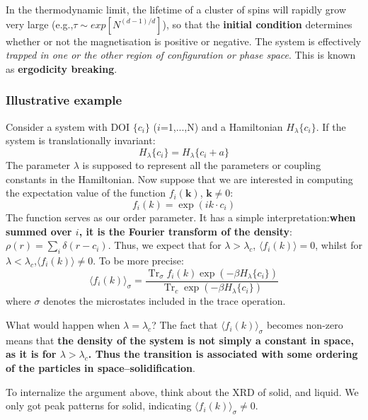 \documentclass[12pt,titlepage]{article}
\numberwithin{equation}{section}
\begin{document}
In the thermodynamic limit, the lifetime of a cluster of spins will rapidly grow very large (e.g.,$\tau\sim exp[N^{(d-1)/d}]$), so that the \textbf{initial condition} determines whether or not the magnetisation is positive or negative. The system is effectively \textit{trapped in one or the other region of configuration or phase space}. This is known as \textbf{ergodicity breaking}.

\subsubsection{Illustrative example}
Consider a system with DOI $\{c_i\}$ ($i$=1,...,N) and a Hamiltonian $H_{\lambda}\{c_i\}$. If the system is translationally invariant:
\begin{equation}
    H _ { \lambda } \{ c _ { i } \} = H _ { \lambda } \{ c _ { i } + a \}
\end{equation}
The parameter $\lambda$ is supposed to represent all the parameters or coupling constants in the Hamiltonian. Now suppose that we are interested in computing the expectation value of the function $f_i(\boldsymbol{k})$, $\boldsymbol{k}\neq0$:
\begin{equation}
    f _ { i } ( k ) = \exp ( i k \cdot c _ { i } ) 
\end{equation}
The function serves as our order parameter. It has a simple interpretation:\textbf{when summed over $i$, it is the Fourier transform of the density}: $\rho(r)=\sum_i\delta(r-c_i)$. Thus, we expect that for $\lambda>\lambda_c$, $\langle f_i(k)\rangle=0$, whilst for $\lambda<\lambda_c$,$\langle f_i(k)\rangle\neq0$. To be more precise:
\begin{equation}
    \langle f _ { i } ( k ) \rangle _ { \sigma } = \frac { \operatorname { Tr } _ { \sigma } f _ { i } ( k ) \exp ( - \beta H _ { \lambda } \{ c _ { i } \} ) } { \operatorname { Tr } _ { c } \exp ( - \beta H _ { \lambda } \{ c _ { i } \} ) }
\end{equation}
where $\sigma$ denotes the microstates included in the trace operation.

What would happen when $\lambda=\lambda_c$? The fact that $\langle f _ { i } ( k ) \rangle _ { \sigma }$ becomes non-zero means that \textbf{the density of the system is not simply a constant in space, as it is for $\lambda>\lambda_c$. Thus the transition is associated with some ordering of the particles in space--solidification}.

To internalize the argument above, think about the XRD of solid, and liquid. We only got peak patterns for solid, indicating $\langle f _ { i } ( k ) \rangle _ { \sigma }\neq 0$.
\end{document}
